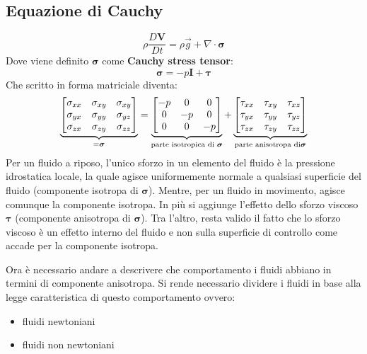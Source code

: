 \subsection{Equazione di Cauchy}
\begin{equation}
\rho \frac{D\mathbf{V}}{Dt} = \rho \vec{g} + \nabla \cdot \boldsymbol{\sigma}
\label{eqn:Cauchy}
\end{equation}
Dove viene definito $\boldsymbol{\sigma}$ come \textbf{Cauchy stress tensor}:
\begin{equation}
\boldsymbol{\sigma} = -p\mathbf{I} + \boldsymbol{\tau}
\label{eqn:StressTensorCauchy}
\end{equation}
Che scritto in forma matriciale diventa:
\begin{equation}
\underbrace{%
\begin{bmatrix}
\sigma_{xx} & \sigma_{xy} & \sigma_{xy} \\
\sigma_{yx} & \sigma_{yy} & \sigma_{yz} \\
\sigma_{zx} & \sigma_{zy} & \sigma_{zz}
\end{bmatrix}}_{= \boldsymbol{\sigma}} =%
\underbrace{%
\begin{bmatrix}
-p & 0 & 0 \\
0 & -p & 0 \\
0 & 0 & -p
\end{bmatrix}}_{\text{parte isotropica di } \boldsymbol{\sigma}} +%
\underbrace{%
\begin{bmatrix}
\tau_{xx} & \tau_{xy} & \tau_{xz} \\
\tau_{yx} & \tau_{yy} & \tau_{yz} \\
\tau_{zx} & \tau_{zy} & \tau_{zz} 
\end{bmatrix}}_{\text{parte anisotropa di} \boldsymbol{\sigma}}
\label{eqn:StressTensorCauchyMatrix}
\end{equation}
Per un fluido a riposo, l'unico sforzo in un elemento del fluido è la pressione idrostatica locale, la quale agisce uniformemente normale a qualsiasi superficie del fluido (componente isotropa di $\boldsymbol{\sigma}$).
Mentre, per un fluido in movimento, agisce comunque la componente isotropa. In più si aggiunge l'effetto dello sforzo viscoso $\boldsymbol{\tau}$ (componente anisotropa di $\boldsymbol{\sigma}$).
Tra l'altro, resta valido il fatto che lo sforzo viscoso è un effetto interno del fluido e non sulla superficie di controllo come accade per la componente isotropa.

Ora è necessario andare a descrivere che comportamento i fluidi abbiano in termini di componente anisotropa. Si rende necessario dividere i fluidi in base alla legge caratteristica di questo comportamento ovvero:
\begin{itemize}
\item fluidi newtoniani
\item fluidi non newtoniani
\end{itemize}

